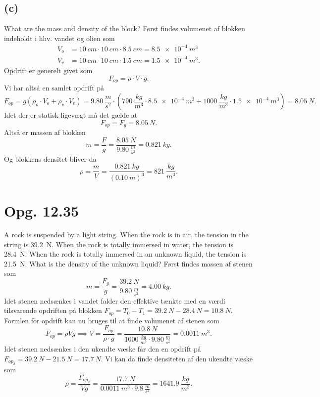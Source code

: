 \documentclass[12pt]{article}
\theoremstyle{definition}
\begin{document}
\subsection*{(c)}
What are the mass and density of the block?
\bigbreak
Først findes volumenet af blokken indeholdt i hhv. vandet og olien som
\begin{align*}
  V_o &= \qty{10}{cm} \cdot \qty{10}{cm} \cdot \qty{8.5}{cm} = \qty{8.5e-4}{m^3} \\
  V_v &= \qty{10}{cm} \cdot \qty{10}{cm} \cdot \qty{1.5}{cm} = \qty{1.5e-4}{m^3} 
.\end{align*}
Opdrift er generelt givet som
\[ 
F_{op} = \rho \cdot V \cdot g
.\]
Vi har altså en samlet opdrift på
\[ 
F_{op} = g(\rho_o \cdot V_o + \rho_v \cdot V_v) = \qty{9.80}{\frac{m}{s^2}} \cdot (\qty{790}{\frac{kg}{m^3}} \cdot \qty{8.5e-4}{m^3} + \qty{1000}{\frac{kg}{m^3}} \cdot \qty{1.5e-4}{m^3}) = \qty{8.05}{N}  
.\]
Idet der er statisk ligevægt må det gælde at
\[ 
F_{op} = F_g = \qty{8.05}{N} 
.\]
Altså er massen af blokken
\[ 
m = \frac{F}{g} = \frac{\qty{8.05}{N}}{\qty{9.80}{\frac{m}{s^2}}} = \qty{0.821}{kg} 
.\]
Og blokkens densitet bliver da
\[ 
\rho =  \frac{m}{V} = \frac{\qty{0.821}{kg}}{\left( \qty{0.10}{m} \right)^3} = \qty{821}{\frac{kg}{m^3}} 
.\]


\section*{Opg. 12.35}
A rock is suspended by a light string. When the rock is in air, the tension in the string is \qty{39,2}{N}. When the rock is totally immersed in water, the tension is \qty{28,4}{N}. When the rock is totally immersed in an unknown liquid, the tension is \qty{21,5}{N}. What is the density of the unknown liquid?
\bigbreak
Først findes massen af stenen som
\[ 
m = \frac{F_g}{g} = \frac{\qty{39,2}{N}}{\qty{9,80}{\frac{m}{s^2}}} = \qty{4,00}{kg} 
.\]
Idet stenen nedsænkes i vandet falder den effektive tænkte med en værdi tilsvarende opdriften på blokken $F_{op} = T_0 - T_1 = \qty{39,2}{N} - \qty{28,4}{N} = \qty{10,8}{N}$. Formlen for opdrift kan nu bruges til at finde volumenet af stenen som
\[ 
F_{op} = \rho Vg \implies V = \frac{F_{op}}{\rho \cdot g} = \frac{\qty{10,8}{N}}{\qty{1000}{\frac{kg}{m^3}} \cdot \qty{9,80}{\frac{m}{s^2}}} = \qty{0.0011}{m^3} 
.\]
Idet stenen nedsænkes i den ukendte væske får den en opdrift på $F_{op_2} = \qty{39,2}{N} - \qty{21,5}{N} = \qty{17,7}{N}$. Vi kan da finde densiteten af den ukendte væske som
\[ 
\rho = \frac{F_{op_2}}{Vg} = \frac{\qty{17,7}{N}}{\qty{0.0011}{m^3} \cdot \qty{9.8}{\frac{m}{s^2}}} = \qty{1641.9}{\frac{kg}{m^3}} 
.\]
\end{document}
